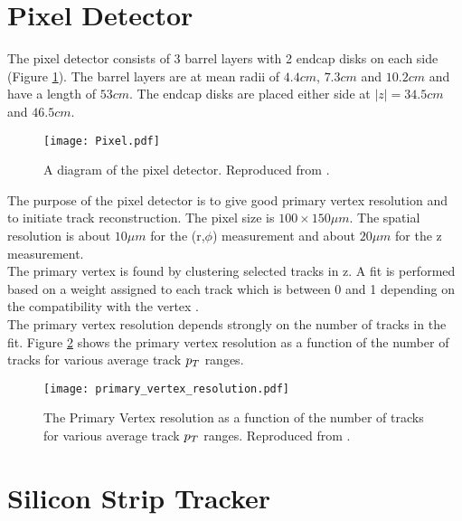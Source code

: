 \section{Pixel Detector}

The pixel detector consists of 3 barrel layers with 2 endcap disks on each side
(Figure \ref{fig:Pixel}). The barrel layers are at mean radii of $4.4\unit{cm}$,
$7.3\unit{cm}$ and $10.2\unit{cm}$ and have a length of $53\unit{cm}$. The 
endcap disks are placed either side at $|z| = 34.5\unit{cm}$ and 
$46.5\unit{cm}$. \\

\begin{figure}
\texttt{[image: Pixel.pdf]}
\caption{A diagram of the pixel detector. Reproduced from \cite{physics_tdr_1}.}
\label{fig:Pixel}
\end{figure}

The purpose of the pixel detector is to give good primary vertex resolution and
to initiate track reconstruction. The pixel size is $100\times150\unit{\mu m}$. 
The spatial resolution is about $10\unit{\mu m}$ for the (r,$\phi$) measurement 
and about $20\unit{\mu m}$ for the z measurement. \\

The primary vertex is found by clustering selected tracks in z. A fit is
performed based on a weight assigned to each track which is between 0 and 1
depending on the compatibility with the vertex \cite{primary_vertex}. \\

The primary vertex resolution depends strongly on the number of tracks in the
fit. Figure \ref{fig:primary_vertex} shows the primary vertex resolution as a
function of the number of tracks for various average track $p_{T}$ ranges.

\begin{figure}
\begin{center}
\texttt{[image: primary\_vertex\_resolution.pdf]}
\end{center}
\caption{The Primary Vertex resolution as a function of the number of tracks for
various average track $p_{T}$ ranges. Reproduced from \cite{primary_vertex}.}
\label{fig:primary_vertex}
\end{figure}

\section{Silicon Strip Tracker}

